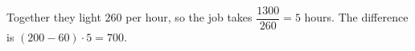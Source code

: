 Together they light $260$ per hour, so the job takes $\dfrac{1300}{260}=5$ hours. The difference is $(200-60)\cdot5=\boxed{700}$.
